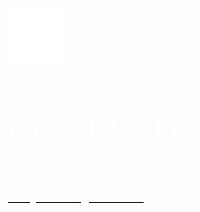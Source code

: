 \documentclass[../main.tex]{subfiles}
\begin{document}
    \hspace*{0.2cm}
    \begin{minipage}[t]{2cm}
        \vspace*{0.5cm}\includegraphics[width=1.5cm]{assets/contact.png}
    \end{minipage}
    \begin{minipage}[t]{5cm}
        \vspace*{0.5cm}

        \section*{\textcolor{white}{CONTACTO}}
        \vspace*{-0.25cm}
        \textcolor{white}{
            +34 660810737 \\
            \underline{\href{mailto:talayaalba@gmail.com}{\textcolor{white}{talayaalba@gmail.com}}}
        }
    \end{minipage}
\end{document}
